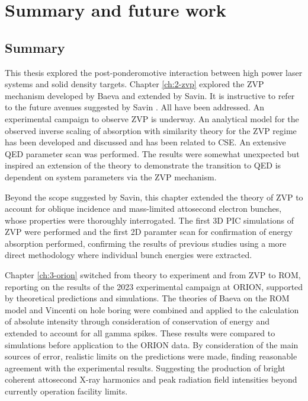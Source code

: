 \chapter{\label{ch:5-summary}Summary and future work} 

\minitoc

\section{Summary}
This thesis explored the post-ponderomotive interaction between high power laser systems and solid density targets. Chapter \ref{ch:2-zvp} explored the ZVP mechanism developed by Baeva and extended by Savin. It is instructive to refer to the future avenues suggested by Savin \cite{savinModellingLaserPlasmaInteractions2019}. All have been addressed. An experimental campaign to observe ZVP is underway. An analytical model for the observed inverse scaling of absorption with similarity theory for the ZVP regime has been developed and discussed and has been related to \ac{CSE}. An extensive QED parameter scan was performed. The results were somewhat unexpected but inspired an extension of the theory to demonstrate the transition to QED is dependent on system parameters via the ZVP mechanism.


Beyond the scope suggested by Savin, this chapter extended the theory of ZVP to account for oblique incidence and mass-limited attosecond electron bunches, whose properties were thoroughly interrogated. The first 3D PIC simulations of ZVP were performed and the first 2D paramter scan for confirmation of energy absorption performed, confirming the results of previous studies using a more direct methodology where individual bunch energies were extracted.

Chapter \ref{ch:3-orion} switched from theory to experiment and from ZVP to ROM, reporting on the results of the 2023 experimental campaign at ORION, supported by theoretical predictions and simulations. The theories of Baeva on the ROM model and Vincenti on hole boring were combined and applied to the calculation of absolute intensity through consideration of conservation of energy and extended to account for all gamma spikes. These results were compared to simulations before application to the ORION data. By consideration of the main sources of error, realistic limits on the predictions were made, finding reasonable agreement with the experimental results. Suggesting the production of bright coherent attosecond X-ray harmonics and peak radiation field intensities beyond currently operation facility limits.

